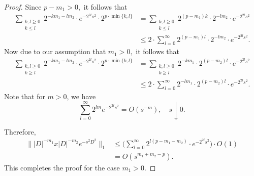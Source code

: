 \begin{proof}
        Since $p-m_1>0,$ it follows that
        \begin{align*}
            \sum_{\substack{k,l\geq0\\ k\leq l}}2^{-km_1-lm_2}\cdot e^{-2^{2l}s^2}\cdot 2^{p\cdot\min\{k,l\}} &= \sum_{\substack{k,l\geq0\\ k\leq l}}2^{(p-m_1)k}\cdot 2^{-lm_2}\cdot e^{-2^{2l}s^2}\\
                                                                                                              &\leq 2\cdot \sum_{l=0}^{\infty}2^{(p-m_1)l}\cdot 2^{-lm_2}\cdot e^{-2^{2l}s^2}.
        \end{align*}
        Now due to our assumption that $m_1>0,$ it follows that
        \begin{align*}
            \sum_{\substack{k,l\geq0\\ k\geq l}}2^{-km_1-lm_2}\cdot e^{-2^{2l}s^2}\cdot 2^{p\cdot\min\{k,l\}} &= \sum_{\substack{k,l\geq0\\ k\geq l}}2^{-km_1}\cdot 2^{(p-m_2)l}\cdot e^{-2^{2l}s^2}\\
                                                                                                              &\leq 2\cdot \sum_{l=0}^{\infty}2^{-lm_1}\cdot 2^{(p-m_2)l}\cdot e^{-2^{2l}s^2}.
        \end{align*}
        Note that for $m > 0$, we have
        \begin{equation*}
            \sum_{l=0}^\infty 2^{lm}e^{-2^{2l}s^2} = O(s^{-m}), \quad s\downarrow 0.
        \end{equation*}

        Therefore,
        \begin{align*}
            \||D|^{-m_1}x|D|^{-m_2}e^{-s^2D^2}\|_1 &\leq \Big(\sum_{l=0}^{\infty}2^{l(p-m_1-m_2)}\cdot e^{-2^{2l}s^2}\Big)\cdot O(1)\\
                                                   &= O(s^{m_1+m_2-p}).
        \end{align*}
        This completes the proof for the case $m_1>0.$


\end{proof}
